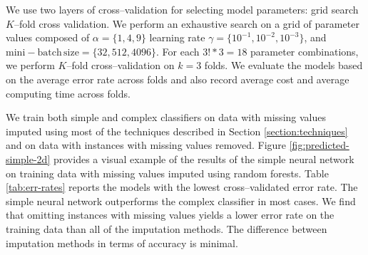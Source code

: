 \documentclass[10pt,twocolumn,letterpaper]{article}
\begin{document}
We use two layers of cross--validation for selecting model parameters: grid search $K$--fold cross validation. We perform an exhaustive search on a grid of parameter values composed of $\alpha = \{1,4,9\}$ learning rate $\gamma = \{10^{-1}, 10^{-2}, 10^{-3}\}$, and $\mathrm{mini-batch\, size} = \{32, 512, 4096\}$. For each $3!*3 = 18$ parameter combinations, we perform $K$--fold cross--validation on $k=3$ folds. We evaluate the models based on the average error rate across folds and also record average cost and average computing time across folds.  

We train both simple and complex classifiers on data with missing values imputed using most of the techniques described in Section \ref{section:techniques} and on data with instances with missing values removed. Figure \ref{fig:predicted-simple-2d} provides a visual example of the results of the simple neural network on training data with missing values imputed using random forests. Table \ref{tab:err-rates} reports the models with the lowest cross--validated error rate. The simple neural network outperforms the complex classifier in most cases. We find that omitting instances with missing values yields a lower error rate on the training data than all of the imputation methods. The difference between imputation methods in terms of accuracy is minimal. 
\end{document}
